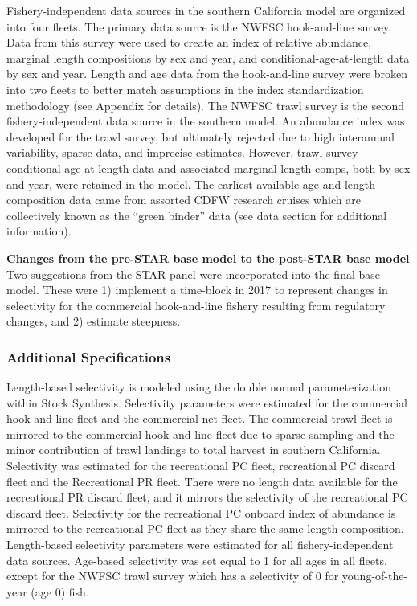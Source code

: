 \documentclass[
  english,
  a4paper,
]{article}
\begin{document}
Fishery-independent data sources in the southern California model are organized into four fleets. The primary data source is the NWFSC hook-and-line survey. Data from this survey were used to create an index of relative abundance, marginal length compositions by sex and year, and conditional-age-at-length data by sex and year. Length and age data from the hook-and-line survey were broken into two fleets to better match assumptions in the index standardization methodology (see Appendix for details). The NWFSC trawl survey is the second fishery-independent data source in the southern model. An abundance index was developed for the trawl survey, but ultimately rejected due to high interannual variability, sparse data, and imprecise estimates. However, trawl survey conditional-age-at-length data and associated marginal length comps, both by sex and year, were retained in the model. The earliest available age and length composition data came from assorted CDFW research cruises which are collectively known as the ``green binder'' data (see data section for additional information).

\textbf{Changes from the pre-STAR base model to the post-STAR base model}
Two suggestions from the STAR panel were incorporated into the final base model. These were 1) implement a time-block in 2017 to represent changes in selectivity for the commercial hook-and-line fishery resulting from regulatory changes, and 2) estimate steepness.

\hypertarget{additional-specifications}{%
\subsubsection{Additional Specifications}\label{additional-specifications}}

Length-based selectivity is modeled using the double normal parameterization within Stock Synthesis. Selectivity parameters were estimated for the commercial hook-and-line fleet and the commercial net fleet. The commercial trawl fleet is mirrored to the commercial hook-and-line fleet due to sparse sampling and the minor contribution of trawl landings to total harvest in southern California. Selectivity was estimated for the recreational PC fleet, recreational PC discard fleet and the Recreational PR fleet. There were no length data available for the recreational PR discard fleet, and it mirrors the selectivity of the recreational PC discard fleet. Selectivity for the recreational PC onboard index of abundance is mirrored to the recreational PC fleet as they share the same length composition. Length-based selectivity parameters were estimated for all fishery-independent data sources. Age-based selectivity was set equal to 1 for all ages in all fleets, except for the NWFSC trawl survey which has a selectivity of 0 for young-of-the-year (age 0) fish.
\end{document}
